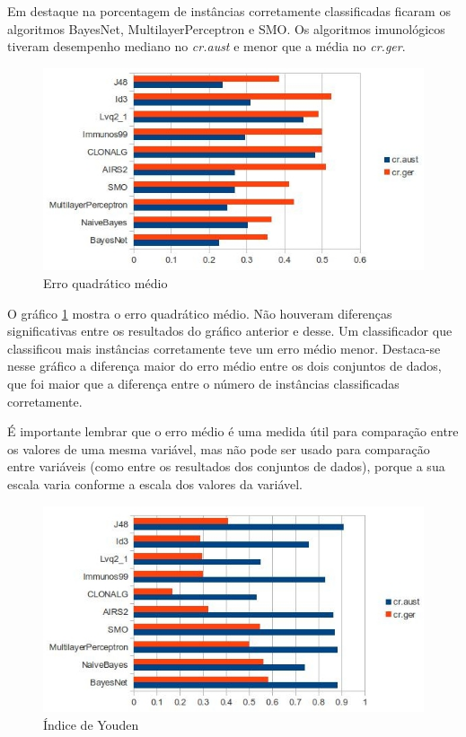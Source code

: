 Em destaque na porcentagem de instâncias corretamente classificadas ficaram os algoritmos BayesNet, MultilayerPerceptron e SMO. Os algoritmos imunológicos tiveram desempenho mediano no \emph{cr.aust} e menor que a média no \emph{cr.ger}.

\begin{figure}[h!]
    \vspace{0.5cm}
    \centering
    \caption{Erro quadrático médio}
    \label{fig:dev_graph_error}
    \includegraphics[width=1\textwidth]{img/graph_error.jpg}
\end{figure}

O gráfico \ref{fig:dev_graph_error} mostra o erro quadrático médio. Não houveram diferenças significativas entre os resultados do gráfico anterior e desse. Um classificador que classificou mais instâncias corretamente teve um erro médio menor. Destaca-se nesse gráfico a diferença maior do erro médio entre os dois conjuntos de dados, que foi maior que a diferença entre o número de instâncias classificadas corretamente.

É importante lembrar que o erro médio é uma medida útil para comparação entre os valores de uma mesma variável, mas não pode ser usado para comparação entre variáveis (como entre os resultados dos conjuntos de dados), porque a sua escala varia conforme a escala dos valores da variável.

\begin{figure}[h!]
    \vspace{0.5cm}
    \centering
    \caption{Índice de Youden}
    \label{fig:dev_graph_youden}
    \includegraphics[width=1\textwidth]{img/graph_youden.jpg}
\end{figure}

